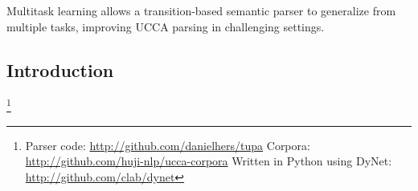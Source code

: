 \documentclass[a0,portrait]{a0poster}
\begin{document}
\vspace{1cm}
\titlespacing*{\section}{0pt}{8mm}{5mm}


\begin{adjustbox}{margin=3mm,frame,minipage=.6\linewidth,center}
\Large\color{Navy}
Multitask learning allows a transition-based semantic parser
to generalize from multiple tasks,
improving UCCA parsing in challenging settings.
\end{adjustbox}


\begin{multicols}{2}


\color{Black}

\section*{Introduction}


\footnote{Parser code: \url{http://github.com/danielhers/tupa} \hfill
Corpora: \url{http://github.com/huji-nlp/ucca-corpora} \hfill
Written in Python using DyNet: \url{http://github.com/clab/dynet}}



\end{multicols}
\end{document}
